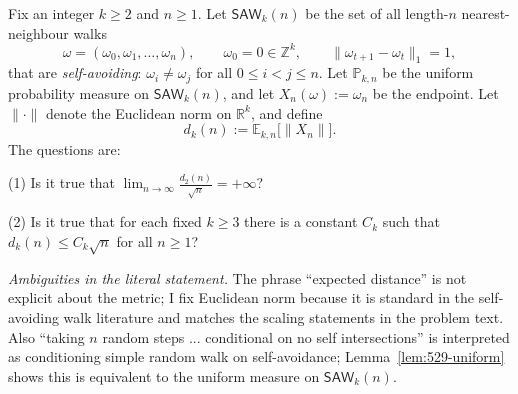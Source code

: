 Fix an integer $k\ge 2$ and $n\ge 1$. Let $\mathsf{SAW}_{k}(n)$ be the set of all length-$n$ nearest-neighbour walks
\[
\omega=(\omega_0,\omega_1,\dots,\omega_n),\qquad \omega_0=0\in\mathbb Z^k,\qquad \|\omega_{t+1}-\omega_t\|_1=1,
\]
that are \emph{self-avoiding}: $\omega_i\neq \omega_j$ for all $0\le i<j\le n$.
Let $\mathbb P_{k,n}$ be the uniform probability measure on $\mathsf{SAW}_{k}(n)$, and let $X_n(\omega):=\omega_n$ be the endpoint.
Let $\|\cdot\|$ denote the Euclidean norm on $\mathbb R^k$, and define
\[
d_k(n):=\mathbb E_{k,n}\big[\|X_n\|\big].
\]
The questions are:

(1) Is it true that $\displaystyle \lim_{n\to\infty}\frac{d_2(n)}{\sqrt n}=+\infty$?

(2) Is it true that for each fixed $k\ge 3$ there is a constant $C_k$ such that $d_k(n)\le C_k\sqrt n$ for all $n\ge 1$?

\emph{Ambiguities in the literal statement.} The phrase ``expected distance'' is not explicit about the metric; I fix Euclidean norm because it is standard in the self-avoiding walk literature and matches the scaling statements in the problem text. Also ``taking $n$ random steps ... conditional on no self intersections'' is interpreted as conditioning simple random walk on self-avoidance; Lemma~\ref{lem:529-uniform} shows this is equivalent to the uniform measure on $\mathsf{SAW}_k(n)$.
